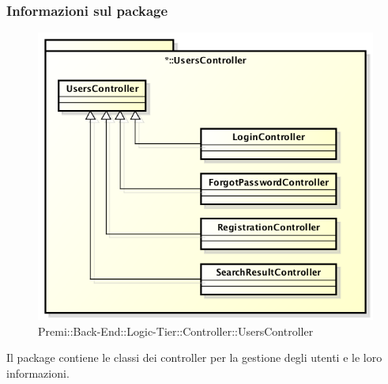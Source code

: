 	\subsubsection*{Informazioni sul package}
		\begin{figure}[h]
			\centering
			\includegraphics[width=0.9\linewidth]{img/back-end_logic-tier_controller_usersController}
			\caption[Premi::Back-End::Logic-Tier::Controller::UsersController]{Premi::Back-End::Logic-Tier::Controller::UsersController}
		\end{figure}
	Il package contiene le classi dei controller per la gestione degli utenti e le loro informazioni.
	
